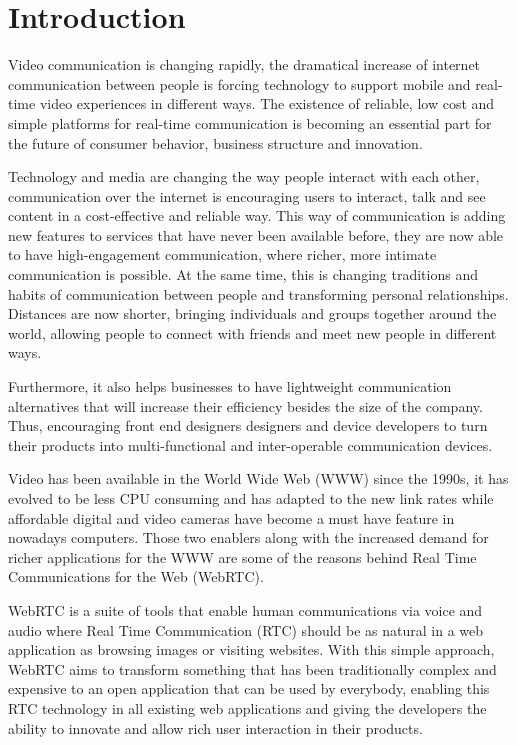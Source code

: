 \section{Introduction}

\thispagestyle{empty}

Video communication is changing rapidly, the dramatical increase of internet communication between people is forcing technology to support mobile and real-time video experiences in different ways. The existence of reliable, low cost and simple platforms for real-time communication is becoming an essential part for the future of consumer behavior, business structure and innovation.

Technology and media are changing the way people interact with each other, communication over the internet is encouraging users to interact, talk and see content in a cost-effective and reliable way. This way of communication is adding new features to services that have never been available before, they are now able to have high-engagement communication, where richer, more intimate communication is possible. At the same time, this is changing traditions and habits of communication between people and transforming personal relationships. Distances are now shorter, bringing individuals and groups together around the world, allowing people to connect with friends and meet new people in different ways.

Furthermore, it also helps businesses to have lightweight communication alternatives that will increase their efficiency besides the size of the company. Thus, encouraging front end designers designers and device developers to turn their products into multi-functional and inter-operable communication devices.

Video has been available in the World Wide Web (WWW) since the 1990s, it has evolved to be less CPU consuming and has adapted to the new link rates while affordable digital and video cameras have become a must have feature in nowadays computers. Those two enablers along with the increased demand for richer applications for the WWW are some of the reasons behind Real Time Communications for the Web (WebRTC).

WebRTC is a suite of tools that enable human communications via voice and audio where Real Time Communication (RTC) should be as natural in a web application as browsing images or visiting websites. With this simple approach, WebRTC aims to transform something that has been traditionally complex and expensive to an open application that can be used by everybody, enabling this RTC technology in all existing web applications and giving the developers the ability to innovate and allow rich user interaction in their products.

